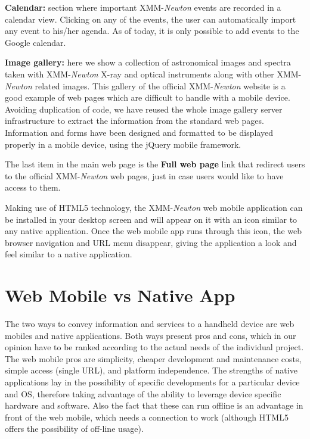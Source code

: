 {\bf Calendar:} section where important XMM-{\em Newton} events are recorded in a
calendar view. Clicking on any of the events, the user can
automatically import any event to his/her agenda. As of today, it is
only possible to add events to the Google calendar.

{\bf Image gallery:} here we show a collection of astronomical images
and spectra taken with XMM-{\em Newton} X-ray and optical instruments along with
other XMM-{\em Newton} related images. This gallery of the official XMM-{\em Newton}
website is a good example of web pages which are difficult to
handle with a mobile device. Avoiding duplication of code, we have
reused the whole image gallery server infrastructure to extract the
information from the standard web pages.  Information and forms have
been designed and formatted to be displayed properly in a mobile
device, using the jQuery mobile framework.

The last item in the main web page is the {\bf Full web page} link that
redirect users to the official XMM-{\em Newton} web pages, just in case users would
like to have access to them.

Making use of HTML5 technology, the XMM-{\em Newton} web mobile application can be
installed in your desktop screen and will appear on it with an icon
similar to any native application. Once the web mobile app runs
through this icon, the web browser navigation and URL menu disappear,
giving the application a look and feel similar to a native
application.

\section{Web Mobile vs Native App}

The two ways to convey information and services to a handheld device
are web mobiles and native applications. Both ways present pros and
cons, which in our opinion have to be ranked according to the actual
needs of the individual project. The web mobile pros are simplicity,
cheaper development and maintenance costs, simple access (single URL),
and platform independence. The strengths of native applications lay in
the possibility of specific developments for a particular device and
OS, therefore taking advantage of the ability to leverage device
specific hardware and software. Also the fact that these can run
offline is an advantage in front of the web mobile, which needs a
connection to work (although HTML5 offers the possibility of
off-line usage).

